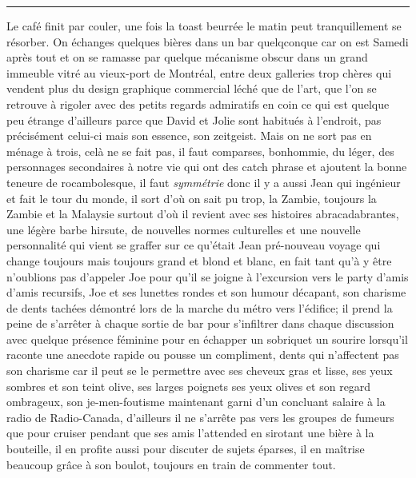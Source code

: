 \begin{center}\noindent\rule{0.5\textwidth}{0.4pt}\end{center} Le café finit par
couler, une fois la toast beurrée le matin peut tranquillement  se résorber. On
échanges quelques bières dans
un bar quelqconque car on est Samedi après tout et on se ramasse par quelque
mécanisme obscur dans un grand immeuble vitré au vieux-port de Montréal, entre
deux galleries trop chères qui vendent plus du design graphique commercial léché
que de l'art, que l'on se retrouve à rigoler avec des petits regards admiratifs
en coin ce qui est quelque peu étrange d'ailleurs parce que David
et Jolie sont habitués à l'endroit, pas précisément celui-ci mais son essence,
son zeitgeist. Mais on ne sort pas en ménage à trois, celà ne se fait pas,
il faut comparses, bonhommie, du léger, des personnages secondaires
à notre vie qui ont des catch phrase et ajoutent la bonne teneure de 
rocambolesque, il faut \emph{symmétrie} donc il y a aussi Jean qui ingénieur et
fait le tour du monde, il sort d'où on sait pu trop, la Zambie, toujours la
Zambie et la Malaysie surtout d'où il revient avec ses histoires
abracadabrantes, une légère barbe hirsute, de nouvelles normes culturelles et
une nouvelle personnalité qui vient se graffer sur ce qu'était Jean pré-nouveau
voyage qui change toujours mais toujours grand et blond et blanc, en fait tant
qu'à y être n'oublions pas d'appeler Joe pour qu'il se joigne à l'excursion vers
le party d'amis d'amis recursifs, Joe et  ses lunettes rondes et son humour
décapant, son charisme de dents tachées démontré lors de la marche du métro
vers l'édifice; il prend la peine de s'arrêter à chaque sortie de bar
pour s'infiltrer dans chaque discussion avec quelque présence féminine pour
en échapper un sobriquet un sourire lorsqu'il raconte une anecdote rapide
ou pousse un compliment, dents qui n'affectent pas son charisme
car il peut se le permettre avec ses cheveux gras et lisse, ses yeux sombres et
son teint olive, ses larges poignets ses yeux olives et son regard ombrageux,
son je-men-foutisme maintenant garni d'un concluant salaire à la radio de
Radio-Canada, d'ailleurs il ne s'arrête pas vers les groupes de fumeurs
que pour cruiser pendant que ses amis l'attended en sirotant une bière à
la bouteille, il en profite aussi pour discuter de sujets éparses, il en maîtrise
beaucoup grâce à son boulot, toujours en train de commenter tout.\\

